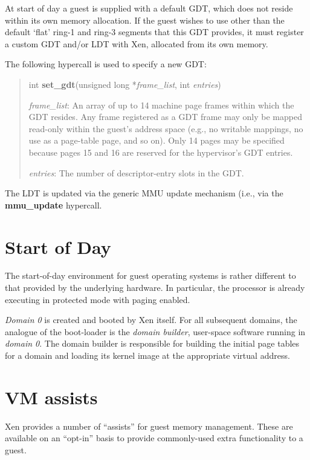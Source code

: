 \documentclass[11pt,twoside,final,openright,a4paper]{report}
\begin{document}
At start of day a guest is supplied with a default GDT, which does not reside
within its own memory allocation.  If the guest wishes to use other
than the default `flat' ring-1 and ring-3 segments that this GDT
provides, it must register a custom GDT and/or LDT with Xen, allocated
from its own memory.

The following hypercall is used to specify a new GDT:

\begin{quote}
  int {\bf set\_gdt}(unsigned long *{\em frame\_list}, int {\em
    entries})

  \emph{frame\_list}: An array of up to 14 machine page frames within
  which the GDT resides.  Any frame registered as a GDT frame may only
  be mapped read-only within the guest's address space (e.g., no
  writable mappings, no use as a page-table page, and so on). Only 14
  pages may be specified because pages 15 and 16 are reserved for
  the hypervisor's GDT entries.

  \emph{entries}: The number of descriptor-entry slots in the GDT.
\end{quote}

The LDT is updated via the generic MMU update mechanism (i.e., via the
{\bf mmu\_update} hypercall.

\section{Start of Day}

The start-of-day environment for guest operating systems is rather
different to that provided by the underlying hardware. In particular,
the processor is already executing in protected mode with paging
enabled.

{\it Domain 0} is created and booted by Xen itself. For all subsequent
domains, the analogue of the boot-loader is the {\it domain builder},
user-space software running in {\it domain 0}. The domain builder is
responsible for building the initial page tables for a domain and
loading its kernel image at the appropriate virtual address.

\section{VM assists}

Xen provides a number of ``assists'' for guest memory management.
These are available on an ``opt-in'' basis to provide commonly-used
extra functionality to a guest.
\end{document}
